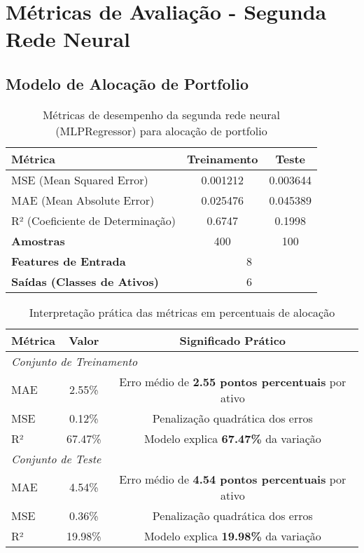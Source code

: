 \documentclass[12pt]{article}
\begin{document}
\section*{Métricas de Avaliação - Segunda Rede Neural}
\subsection*{Modelo de Alocação de Portfolio}

\begin{table}[h!]
\centering
\caption{Métricas de desempenho da segunda rede neural (MLPRegressor) para alocação de portfolio}
\label{tab:metricas_segunda_rede}
\begin{tabular}{lcc}
\toprule
\textbf{Métrica} & \textbf{Treinamento} & \textbf{Teste} \\
\midrule
MSE (Mean Squared Error) & 0.001212 & 0.003644 \\
MAE (Mean Absolute Error) & 0.025476 & 0.045389 \\
R² (Coeficiente de Determinação) & 0.6747 & 0.1998 \\
\midrule
\textbf{Amostras} & 400 & 100 \\
\textbf{Features de Entrada} & \multicolumn{2}{c}{8} \\
\textbf{Saídas (Classes de Ativos)} & \multicolumn{2}{c}{6} \\
\bottomrule
\end{tabular}
\end{table}

\begin{table}[h!]
\centering
\caption{Interpretação prática das métricas em percentuais de alocação}
\label{tab:interpretacao_metricas}
\begin{tabular}{lcc}
\toprule
\textbf{Métrica} & \textbf{Valor} & \textbf{Significado Prático} \\
\midrule
\multicolumn{3}{l}{\textit{Conjunto de Treinamento}} \\
\midrule
MAE & 2.55\% & Erro médio de \textbf{2.55 pontos percentuais} por ativo \\
MSE & 0.12\% & Penalização quadrática dos erros \\
R² & 67.47\% & Modelo explica \textbf{67.47\%} da variação \\
\midrule
\multicolumn{3}{l}{\textit{Conjunto de Teste}} \\
\midrule
MAE & 4.54\% & Erro médio de \textbf{4.54 pontos percentuais} por ativo \\
MSE & 0.36\% & Penalização quadrática dos erros \\
R² & 19.98\% & Modelo explica \textbf{19.98\%} da variação \\
\bottomrule
\end{tabular}
\end{table}
\end{document}
